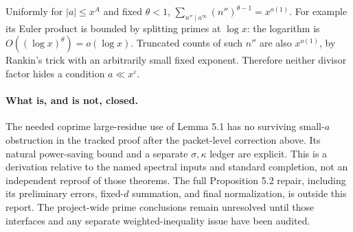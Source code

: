 Uniformly for $|a|\leq x^A$ and fixed $\theta<1$,
$\sum_{n''\mid a^\infty}(n'')^{\theta-1}=x^{o(1)}$.
For example its Euler product is bounded by splitting primes at
$\log x$: the logarithm is $O((\log x)^\theta)=o(\log x)$.
Truncated counts of such $n''$ are also $x^{o(1)}$, by Rankin's trick
with an arbitrarily small fixed exponent.  Therefore neither divisor
factor hides a condition $a\ll x^\varepsilon$.

\paragraph{What is, and is not, closed.}
The needed coprime large-residue use of Lemma 5.1 has no surviving
small-$a$ obstruction in the tracked proof after the packet-level
correction above.  Its natural power-saving bound and a separate
$\sigma,\kappa$ ledger are explicit.  This is a derivation relative to
the named spectral inputs and standard completion, not an independent
reproof of those theorems.  The full Proposition 5.2 repair, including
its preliminary errors, fixed-$d$ summation, and final normalization,
is outside this report.  The project-wide prime conclusions remain
unresolved until those interfaces and any separate weighted-inequality
issue have been audited.
